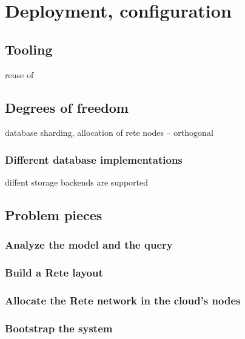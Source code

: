 \section{Deployment, configuration}
\label{sec:deployment-configuration}

\subsection{Tooling}

reuse of \eiq



\subsection{Degrees of freedom}

database sharding, allocation of rete nodes -- orthogonal

\subsubsection{Different database implementations}

diffent storage backends are supported



\subsection{Problem pieces}

\subsubsection{Analyze the model and the query}

\subsubsection{Build a Rete layout}

\subsubsection{Allocate the Rete network in the cloud's nodes}

\subsubsection{Bootstrap the system}



